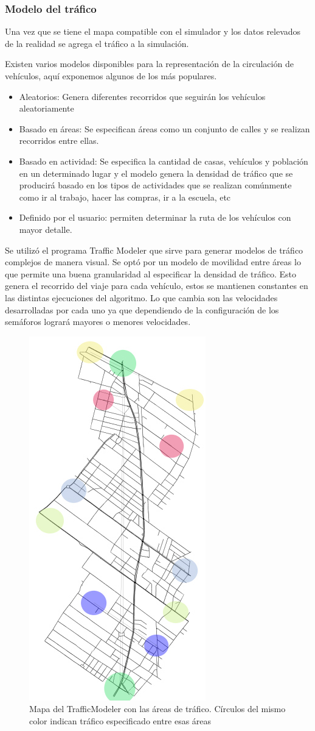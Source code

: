 \newpage
\subsubsection{Modelo del tráfico}
Una vez que se tiene el mapa compatible con el simulador y los datos relevados de la realidad se agrega el tráfico a la simulación.

Existen varios modelos disponibles para la representación de la circulación de vehículos, aquí exponemos algunos de los más populares. 
\begin{itemize}
	\item Aleatorios: Genera diferentes recorridos que seguirán los vehículos aleatoriamente
	\item Basado en áreas:  Se especifican áreas como un conjunto de calles y se realizan recorridos entre ellas.
	\item Basado en actividad: Se especifica la cantidad de casas, vehículos y población en un determinado lugar y el modelo genera la densidad de tráfico que se producirá basado en los tipos de actividades que se realizan comúnmente como ir al trabajo, hacer las compras, ir a la escuela,  etc
	\item Definido por el usuario: permiten determinar la ruta de los vehículos con mayor detalle.
\end{itemize}


Se utilizó el programa Traffic Modeler \citep{TrafficModeler} que sirve para generar modelos de tráfico complejos de manera visual. Se optó por un modelo de movilidad entre áreas lo que permite una buena granularidad al especificar la densidad de tráfico. Esto genera el recorrido del viaje para cada vehículo, estos se mantienen constantes en las distintas ejecuciones del algoritmo. Lo que cambia son las velocidades desarrolladas por cada uno ya que dependiendo de la configuración de los semáforos logrará mayores o menores velocidades.



\begin{figure}[h]
	\centering
	\includegraphics[width=0.3\linewidth]{Figures/areaflow1}
	\caption{Mapa del TrafficModeler con las áreas de tráfico. Círculos del mismo color indican tráfico especificado entre esas áreas}
	\label{fig:areaflow1}
\end{figure}


